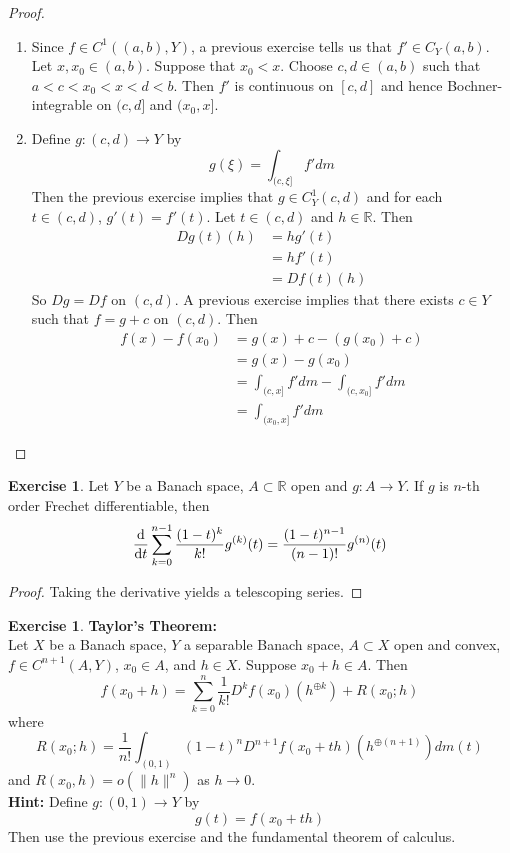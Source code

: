 \documentclass[12pt]{amsart}
\theoremstyle{definition}
\newtheorem{ex}[definition]{Exercise}
\newcommand{\R}{\mathbb{R}}
\begin{document}
	\begin{proof}
	\begin{enumerate}
	\item Since $f \in C^1((a,b), Y)$, a previous exercise tells us that $f' \in C_Y(a,b)$. Let $x, x_0 \in (a,b)$. Suppose that $x_0 < x$. Choose $c,d \in (a,b)$ such that $a < c < x_0< x< d < b$. Then $f'$ is continuous on $[c,d]$ and hence Bochner-integrable on $(c,d]$ and $(x_0,x]$. 
	\item Define $g: (c,d) \rightarrow Y$ by $$g(\xi) = \int_{(c, \xi]}f'dm$$
	Then the previous exercise implies that $g \in C^1_Y(c,d)$ and for each $t \in (c, d)$, $g'(t) = f'(t)$. Let $t \in (c,d)$ and $h \in \R$. Then
	\begin{align*}
	Dg(t)(h) 
	&= hg'(t) \\
	&= hf'(t) \\
	&= Df(t)(h)
	\end{align*}
	So $Dg = Df$ on $(c,d)$. A previous exercise implies that there exists $c \in Y$ such that $f = g + c$ on $(c, d)$. Then 
	\begin{align*}
	f(x) - f(x_0)
	&= g(x)+c - (g(x_0)+c) \\
	&= g(x) - g(x_0) \\
	&= \int_{(c, x]}f'dm - \int_{(c, x_0]}f'dm\\
	&= \int_{(x_0, x]}f'dm
	\end{align*}
	\end{enumerate}
	\end{proof}
	
	
	\begin{ex}
	Let $Y$ be a Banach space, $A \subset \R$ open and $g:A \rightarrow Y$. If $g$ is $n$-th order Frechet differentiable, then 
	$$\dv{t} \sum_{k=0}^{n-1} \frac{(1-t)^k}{k!}g^{(k)}(t) = \frac{(1-t)^{n-1}}{(n-1)!}g^{(n)}(t)$$
	\end{ex}
	
	\begin{proof}
	Taking the derivative yields a telescoping series.
	\end{proof}
	
	
	
	\begin{ex}\textbf{Taylor's Theorem:}\\
	Let $X$ be a Banach space, $Y$ a separable Banach space, $A \subset X$ open and convex, $f\in C^{n+1}(A, Y)$, $x_0 \in A$, and $h \in X$. Suppose $x_0 + h \in A$. Then $$f(x_0 + h) = \sum_{k=0}^{n} \frac{1}{k!} D^k f(x_0)(h^{\oplus k}) + R(x_0;h)$$ 
	where $$R(x_0;h) = \frac{1}{n!}\int_{(0,1)} (1-t)^{n}D^{n+1}f(x_0 + th)(h^{\oplus (n+1)})d m(t)$$
	and $R(x_0, h) = o(\|h\|^{n})$ as $h \rightarrow 0$.\\
	\textbf{Hint:} Define $g: (0,1) \rightarrow Y$ by $$g(t) = f(x_0 +t h)$$ Then use the previous exercise and the fundamental theorem of calculus.
	\end{ex}
	
\end{document}

